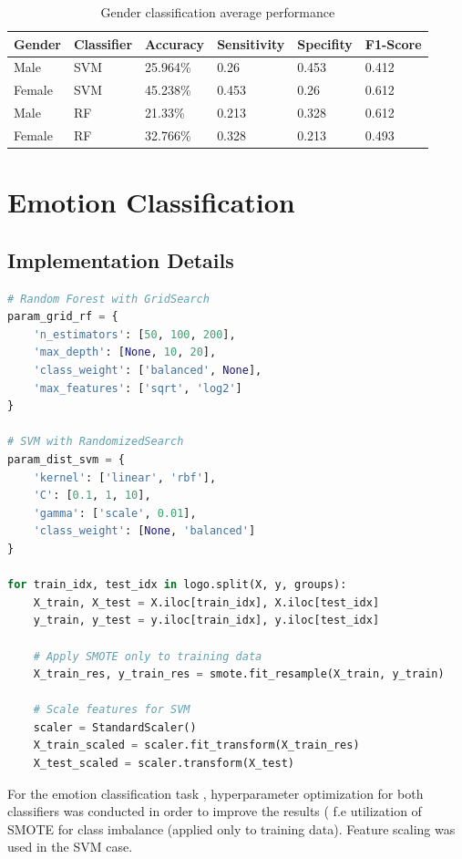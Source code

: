 \documentclass[12pt]{ieeetj}
\begin{document}
\begin{table}[H]
\centering
\begin{tabular}{llllll}
\toprule
	Gender & Classifier & Accuracy & Sensitivity & Specifity & F1-Score \\
\midrule
	Male & SVM & 25.964\% & 0.26 & 0.453 & 0.412 \\
	Female & SVM & 45.238\% & 0.453 & 0.26 & 0.612 \\
	Male & RF & 21.33\% & 0.213 &  0.328 & 0.612 \\
	Female & RF & 32.766\% & 0.328 & 0.213 & 0.493 \\
\bottomrule
\end{tabular}
\caption{Gender classification average performance}
\end{table}

\section{Emotion Classification}
\subsection{Implementation Details}
\begin{lstlisting}[language=Python]
# Random Forest with GridSearch
param_grid_rf = {
    'n_estimators': [50, 100, 200],
    'max_depth': [None, 10, 20],
    'class_weight': ['balanced', None],
    'max_features': ['sqrt', 'log2']
}

# SVM with RandomizedSearch
param_dist_svm = {
    'kernel': ['linear', 'rbf'],
    'C': [0.1, 1, 10],           
    'gamma': ['scale', 0.01],     
    'class_weight': [None, 'balanced']
}

for train_idx, test_idx in logo.split(X, y, groups):
    X_train, X_test = X.iloc[train_idx], X.iloc[test_idx]
    y_train, y_test = y.iloc[train_idx], y.iloc[test_idx]
    
    # Apply SMOTE only to training data
    X_train_res, y_train_res = smote.fit_resample(X_train, y_train)
    
    # Scale features for SVM
    scaler = StandardScaler()
    X_train_scaled = scaler.fit_transform(X_train_res)
    X_test_scaled = scaler.transform(X_test)
\end{lstlisting}

For the emotion classification task , hyperparameter optimization for both classifiers was conducted in 
order to improve the results ( f.e utilization of SMOTE for class imbalance (applied only to training data). 
Feature scaling was used in the SVM case.
\end{document}
